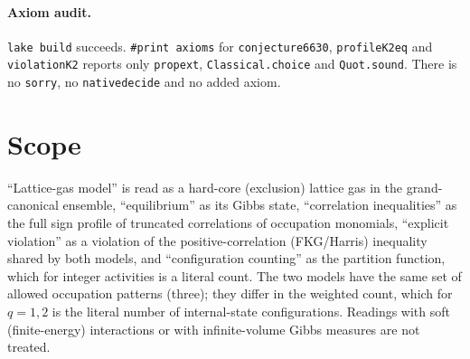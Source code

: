\documentclass[11pt]{article}
\theoremstyle{definition}
\theoremstyle{remark}
\renewcommand{\_}{\oldus\allowbreak}
\begin{document}
\paragraph{Axiom audit.} \texttt{lake build} succeeds. \texttt{\#print axioms} for
\texttt{conjecture6630}, \texttt{profile\_K2\_eq} and \texttt{violation\_K2} reports only
\texttt{propext}, \texttt{Classical.choice} and \texttt{Quot.sound}. There is no \texttt{sorry}, no
\texttt{native\_decide} and no added axiom.

\section{Scope}

``Lattice-gas model'' is read as a hard-core (exclusion) lattice gas in the grand-canonical
ensemble, ``equilibrium'' as its Gibbs state, ``correlation inequalities'' as the full sign
profile of truncated correlations of occupation monomials, ``explicit violation'' as a violation
of the positive-correlation (FKG/Harris) inequality shared by both models, and ``configuration
counting'' as the partition function, which for integer activities is a literal count. The two
models have the same set of allowed occupation patterns (three); they differ in the weighted
count, which for $q=1,2$ is the literal number of internal-state configurations.
Readings with soft (finite-energy) interactions or with infinite-volume Gibbs measures are not
treated.
\end{document}
